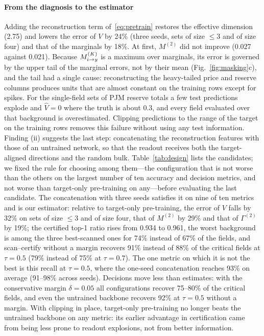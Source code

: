 \paragraph{From the diagnosis to the estimator}
Adding the reconstruction term of~\eqref{eq:pretrain} restores the effective dimension (2.75) and lowers the error of
$V$ by 24\% (three seeds, sets of size $\le3$ and of size four) and that of the marginals by 18\%. At first, $M^{(2)}$ did
not improve (0.027 against 0.021). Because $M^{(K)}_{i \to y}$ is a maximum over marginals, its error is governed by the upper tail of
the marginal errors, not by their mean (Fig.~\ref{fig:masking}c), and the tail had a single cause: reconstructing the
heavy-tailed price and reserve columns produces units that are almost constant on the training rows except for spikes.
For the single-field sets of PJM reserve totals a few test predictions explode and $\hat V=0$ where the truth is about
0.3, and every field evaluated over that background is overestimated. Clipping predictions to the range of the target
on the training rows removes this failure without using any test information. Finding (ii) suggests the last step:
concatenating the reconstruction features with those of an untrained network, so that the readout receives both the
target-aligned directions and the random bulk. Table~\ref{tab:design} lists the candidates; we fixed the rule for choosing
among them---the configuration that is not worse than the others on the largest number of ten accuracy and decision
metrics, and not worse than target-only pre-training on any---before evaluating the last candidate. The concatenation with
three seeds satisfies it on nine of ten metrics and is our estimator: relative to target-only pre-training, the error of
$V$ falls by 32\% on sets of size $\le3$ and of size four, that of $M^{(2)}$ by 29\% and that of $\Gamma^{(2)}$ by 19\%;
the certified top-1 ratio rises from 0.934 to 0.961, the worst background is among the three best-scanned ones for 74\%
instead of 67\% of the fields, and scan--certify without a margin recovers 91\% instead of 88\% of the critical fields at
$\tau=0.5$ (79\% instead of 75\% at $\tau=0.7$). The one metric on which it is not the best is this recall at $\tau=0.5$,
where the one-seed concatenation reaches 93\% on average (91--98\% across seeds). Decisions move less than estimates:
with the conservative margin $\delta=0.05$ all configurations recover 75--80\% of the critical fields, and even the
untrained backbone recovers 92\% at $\tau=0.5$ without a margin. With clipping in place, target-only pre-training no longer
beats the untrained backbone on any metric: its earlier advantage in certification came from being less prone to readout
explosions, not from better information.

